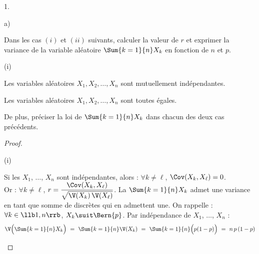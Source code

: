 \begin{noliste}{1.}
  \setlength{\itemsep}{4mm}
  \item
  \begin{noliste}{a)}
    \setlength{\itemsep}{2mm}
    \item Dans les cas $(i)$ et $(ii)$ suivants, calculer la valeur 
    de $r$ et exprimer la variance de la variable aléatoire $ 
    \Sum{k=1}{n} X_k$ en fonction de $n$ et $p$.
    \begin{nonoliste}{(i)}
      \item Les variables aléatoires $X_1, X_2, \ldots, X_n$ sont 
      mutuellement indépendantes.
      
      \item Les variables aléatoires $X_1, X_2, \ldots, X_n$ sont 
      toutes égales.
    \end{nonoliste}
    
    De plus, préciser la loi de $\Sum{k=1}{n} X_k$ dans chacun 
    des deux cas précédents.
    
    \begin{proof}~
      \begin{nonoliste}{(i)}
      \item Si les \var $X_1$, $\ldots$, $X_n$ sont indépendantes,
        alors : $\forall k \neq \ell$, $\Cov(X_k,X_\ell)=0$.\\[.1cm]
        Or : $\forall k \neq \ell$, $r = \dfrac{\Cov(X_k,X_\ell)}{
          \sqrt{\V(X_k) \, \V(X_\ell)}}$.%
        La \var $\Sum{k=1}{n} X_k$ admet une variance en tant que
        somme de \var discrètes qui en admettent une. On rappelle :
        $\forall k \in \llb 1,n \rrb$, $X_k \suit \Bern{p}$. Par
        indépendance de $X_1$, $\ldots$, $X_n$ :
        \[
          \V\Big( \Sum{k=1}{n} X_k\Big) \ = \ \Sum{k=1}{n} \V(X_k)
          \ = \ \Sum{k=1}{n} \Big(p (1-p)\Big) \ = \ n \, p \, (1-p)
        \]
        

\end{nonoliste}
\end{proof}
\end{noliste}
\end{noliste}
